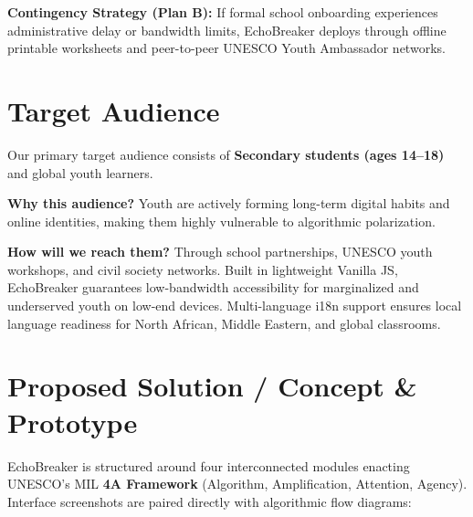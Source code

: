 \documentclass[11pt, a4paper]{article}
\begin{document}
\textbf{Contingency Strategy (Plan B):} If formal school onboarding experiences administrative delay or bandwidth limits, EchoBreaker deploys through offline printable worksheets and peer-to-peer UNESCO Youth Ambassador networks.

\section{Target Audience}

Our primary target audience consists of \textbf{Secondary students (ages 14--18)} and global youth learners. 

\textbf{Why this audience?} Youth are actively forming long-term digital habits and online identities, making them highly vulnerable to algorithmic polarization.

\textbf{How will we reach them?} Through school partnerships, UNESCO youth workshops, and civil society networks. Built in lightweight Vanilla JS, EchoBreaker guarantees low-bandwidth accessibility for marginalized and underserved youth on low-end devices. Multi-language i18n support ensures local language readiness for North African, Middle Eastern, and global classrooms.

\section{Proposed Solution / Concept \& Prototype}

EchoBreaker is structured around four interconnected modules enacting UNESCO's MIL \textbf{4A Framework} (Algorithm, Amplification, Attention, Agency). Interface screenshots are paired directly with algorithmic flow diagrams:
\end{document}
